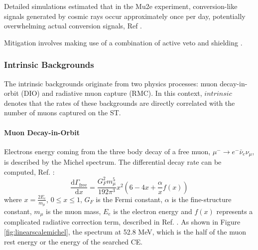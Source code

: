 

Detailed simulations estimated that in the Mu2e experiment, 
conversion-like signals generated by cosmic rays occur approximately once per day, 
{\del potentially overwhelming actual conversion signals, Ref} \cite{CRVposter}.

Mitigation 
involves making use of a combination of active veto and shielding .


\subsubsection{Intrinsic Backgrounds}
The intrinsic backgrounds  originate from two physics processes: 
muon decay-in-orbit (DIO) and radiative muon capture (RMC). In this context, 
$intrinsic$ denotes that the rates of these backgrounds are directly correlated 
with the number of muons captured on the ST.



\paragraph{Muon Decay-in-Orbit}
Electrons energy coming from the three body decay of a free muon, 
$\mu^- \rightarrow e^- \bar{\nu}_e \nu_\mu$, is described by the Michel 
spectrum. The differential decay rate can be computed, Ref. \cite{michel}:
\begin{equation}
    \frac{\text{d}\Gamma_{\text{free}}}{\text{d}x}= \frac{G^2_F m^5_\mu}{192 \pi^3}x^2(6-4x+\frac{\alpha}{x}f(x)) 
\end{equation}
where $x=\frac{2 E_e}{m_\mu}$, $0\leq x\leq 1$, $G_F$ is the Fermi constant, 
$\alpha$ is the fine-structure constant, $m_\mu$ is the muon mass, $E_e$ is the 
electron energy and $f (x)$ represents a complicated radiative correction term, 
described in Ref. \cite{PhysRev.113.1652}.
{\red
As shown in Figure \ref{fig:linearscalemichel}, the spectrum 
 at 52.8 MeV, which is the half of the muon rest energy or the energy of the searched CE.
}


